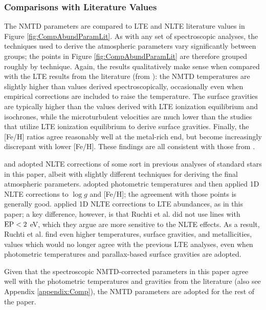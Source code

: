 \documentclass[preprint]{aastex61}
\begin{document}
\subsubsection{Comparisons with Literature Values}\label{subsubsec:StdAtmParamLitComp}
The NMTD parameters are compared to LTE and NLTE literature
values in Figure \ref{fig:CompAbundParamLit}.  As with any set of
spectroscopic analyses, the techniques used to derive the atmospheric
parameters vary significantly between groups; the points in Figure
\ref{fig:CompAbundParamLit} are therefore grouped roughly by
technique.  Again, the results qualitatively make sense when compared
with the LTE results from the literature (from
\citealt{Frebel2007,Hollek2011,Roederer2014,Thanathibodee2016,Placco2017}):
the NMTD temperatures are slightly higher than values derived
spectroscopically, occasionally even when empirical corrections are
included to raise the temperature.  The surface gravities are
typically higher than the values derived with LTE ionization
equilibrium and isochrones, while the microturbulent velocities are
much lower than the studies that utilize LTE ionization equilibrium to
derive surface gravities. Finally, the [Fe/H] ratios agree reasonably
well at the metal-rich end, but become increasingly discrepant with
lower [Fe/H].  These findings are all consistent with those from
\citet{Amarsi2016}.

\citet{Hansen2013} and \citet{Ruchti2013} adopted NLTE corrections of
some sort in previous analyses of standard stars in this paper, albeit
with slightly different techniques for deriving the final atmospheric
parameters.  \citet{Hansen2013} adopted photometric temperatures and
then applied 1D NLTE corrections to $\log g$ and [Fe/H]; the agreement
with those points is generally good. \citet{Ruchti2013} applied 1D
NLTE corrections to LTE abundances, as in this paper; a key
difference, however, is that Ruchti et al. did not use 
lines with $\rm{EP}<2$ eV, which they argue are more sensitive to the
NLTE effects.  As a result, Ruchti et al. find even higher
temperatures, surface gravities, and metallicities, values which would
no longer agree with the previous LTE analyses, even when photometric
temperatures and parallax-based surface gravities are adopted.

Given that the spectroscopic NMTD-corrected parameters in this paper
agree well with the photometric temperatures and gravities from the
literature (also see Appendix \ref{appendix:Comp}), the NMTD
parameters are adopted for the rest of the paper.
\end{document}

